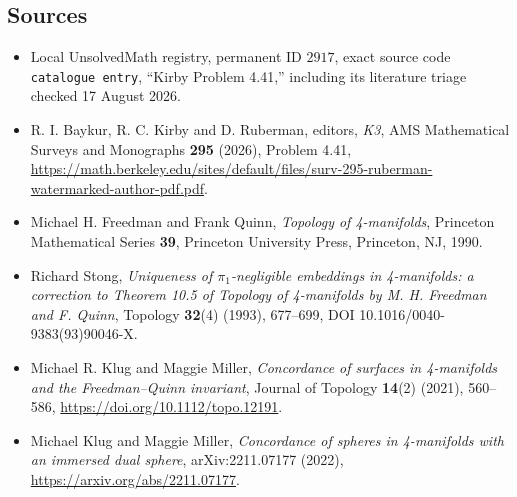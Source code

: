 \documentclass[11pt]{article}
\begin{document}
\subsection{Sources}
\begin{itemize}
\item Local UnsolvedMath registry, permanent ID $2917$, exact source code \texttt{catalogue entry}, ``Kirby Problem 4.41,'' including its literature triage checked 17 August 2026.
\item R. I. Baykur, R. C. Kirby and D. Ruberman, editors, \emph{K3}, AMS Mathematical Surveys and Monographs \textbf{295} (2026), Problem 4.41, \url{https://math.berkeley.edu/sites/default/files/surv-295-ruberman-watermarked-author-pdf.pdf}.
\item [FQ90] Michael H. Freedman and Frank Quinn, \emph{Topology of 4-manifolds}, Princeton Mathematical Series \textbf{39}, Princeton University Press, Princeton, NJ, 1990.
\item [Sto93] Richard Stong, \emph{Uniqueness of $\pi_1$-negligible embeddings in 4-manifolds: a correction to Theorem 10.5 of Topology of 4-manifolds by M. H. Freedman and F. Quinn}, Topology \textbf{32}(4) (1993), 677--699, DOI 10.1016/0040-9383(93)90046-X.
\item [KM21] Michael R. Klug and Maggie Miller, \emph{Concordance of surfaces in 4-manifolds and the Freedman--Quinn invariant}, Journal of Topology \textbf{14}(2) (2021), 560--586, \url{https://doi.org/10.1112/topo.12191}.
\item [KM22] Michael Klug and Maggie Miller, \emph{Concordance of spheres in 4-manifolds with an immersed dual sphere}, arXiv:2211.07177 (2022), \url{https://arxiv.org/abs/2211.07177}.
\end{itemize}
\end{document}
